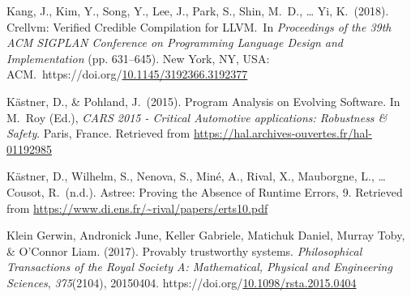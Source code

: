 \documentclass[12pt,twoside]{article}
\begin{document}
{\begin{thebibliography}{222}
\mdbibitemlabel{}Kang, J., Kim, Y., Song, Y., Lee, J., Park, S., Shin, M.~D., … Yi, K.~(2018). Crellvm: Verified Credible Compilation for LLVM.~In \emph{Proceedings of the 39th ACM SIGPLAN Conference on Programming Language Design and Implementation} (pp. 631–645). New York, NY, USA: ACM.~https://doi.org/\href{https://dx.doi.org/10.1145/3192366.3192377}{10.1145/3192366.3192377}\label{kang_crellvm:_2018}%

\mdbibitemlabel{}Kästner, D., \& Pohland, J.~(2015). Program Analysis on Evolving Software. In M.~Roy (Ed.), \emph{CARS 2015 - Critical Automotive applications: Robustness \& Safety}. Paris, France. Retrieved from \href{https://hal.archives-ouvertes.fr/hal-01192985}{{\ttfamily https://\hspace{0pt}hal.\hspace{0pt}archives-\hspace{0pt}ouvertes.\hspace{0pt}fr/\hspace{0pt}hal-\hspace{0pt}01192985}}\label{kastner_program_2015}%

\mdbibitemlabel{}Kästner, D., Wilhelm, S., Nenova, S., Miné, A., Rival, X., Mauborgne, L., … Cousot, R.~(n.d.). Astree: Proving the Absence of Runtime Errors, 9. Retrieved from \href{https://www.di.ens.fr/~rival/papers/erts10.pdf}{{\ttfamily https://\hspace{0pt}www.\hspace{0pt}di.\hspace{0pt}ens.\hspace{0pt}fr/\hspace{0pt}\textasciitilde{}rival/\hspace{0pt}papers/\hspace{0pt}erts10.\hspace{0pt}pdf}}\label{kastner_astree:_nodate}%

\mdbibitemlabel{}Klein Gerwin, Andronick June, Keller Gabriele, Matichuk Daniel, Murray Toby, \& O’Connor Liam. (2017). Provably trustworthy systems. \emph{Philosophical Transactions of the Royal Society A: Mathematical, Physical and Engineering Sciences}, \emph{375}(2104), 20150404. https://doi.org/\href{https://dx.doi.org/10.1098/rsta.2015.0404}{10.1098/rsta.2015.0404}\label{klein_gerwin_provably_2017}%


\end{thebibliography}}
\end{document}
